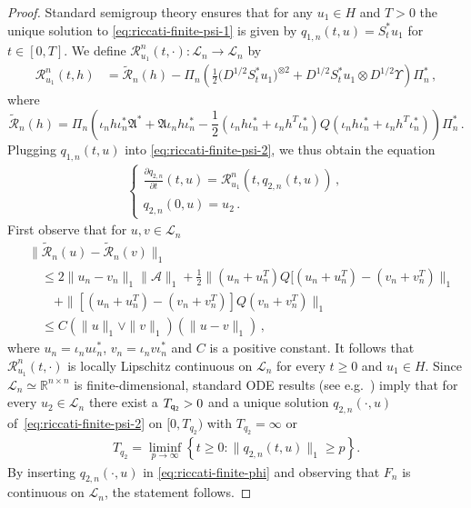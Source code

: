 \documentclass[10pt,a4paper,reqno]{amsart}
\numberwithin{equation}{section}
\theoremstyle{plain}
\theoremstyle{definition}
\theoremstyle{example}
\renewcommand{\MR}{\mathbb{R}}
\newcommand{\R}{\MR}
\newcommand{\cA}{\mathcal{A}}
\newcommand{\cL}{\mathcal{L}}
\newcommand{\cO}{\mathcal{O}}
\newcommand{\cR}{\mathcal{R}}
\newcommand{\fA}{\mathfrak{A}}
\newcommand{\set}[1]{\left\{ #1\right\}}
\newcommand{\norm}[1]{\|#1\|}
\begin{document}
\begin{proof}
Standard semigroup theory ensures that for any $u_{1}\in H$ and $T>0$ the unique solution to
\eqref{eq:riccati-finite-psi-1} is given by $q_{1,n}(t,u)=S_t^*u_{1}$ for $t\in
[0,T]$. We define $\cR_{u_1}^n (t, \cdot)\colon \cL_n \to \cL_n$ by 
\begin{align}\label{eq:Ru1}
\cR_{u_1}^n(t,h) &=  \tilde{\cR}_n(h)-\Pi_n\left(\tfrac{1}{2}\big(D^{1/2}S_t^*u_{1}\big)^{\otimes 2}+ D^{1/2}S_t^*u_{1}\otimes D^{1/2}\Upsilon\right)\Pi_n^*\,,
\end{align}
where 
$$\tilde{\cR}_n(h)=\Pi_n\left( \iota_n h\iota_n^*\fA^*+\fA \iota_n h \iota_n^* - \frac{1}{2}(\iota_n h \iota_n^*+ \iota_n h^T \iota_n^*) Q(\iota_n h \iota_n^*+ \iota_n h^T \iota_n^*)\right)\Pi_n^*\,.$$
Plugging $q_{1,n}(t,u)$ into \eqref{eq:riccati-finite-psi-2}, we thus obtain the equation
\begin{align*}
  \begin{cases}
    \frac{\partial q_{2,n}}{\partial t}(t,u)= \cR_{u_1}^n(t, q_{2,n}(t,u))\,,\\
     q_{2,n}(0,u)=u_{2}\,. 
  \end{cases}
\end{align*}
First observe that for $u, v \in \cL_n$
\begin{align*}
    &\norm{\tilde{\cR}_n(u) - \tilde{\cR}_n( v)}_1\\
    &\quad\leq  
    2\|u_n-v_n\|_{1} \|\cA\|_{1} + \frac{1}{2} \norm{(u_n+u_n^T)Q[(u_n+u_n^T)-(v_n+v_n^T)}_{1}\\
    &\qquad +\norm{[(u_n+u_n^T)-(v_n+v_n^T)]Q(v_n+v_n^T)}_{1} \\
    &\quad \leq C (\norm{u}_1 \vee \norm{v}_1)(\|u-v\|_1)\,,
\end{align*}
where $u_n = \iota_n u\iota^*_n$, $v_n = \iota_n v\iota^*_n$ and $C$ is a positive constant. It follows that 
$\cR_{u_{1}}^n(t,\cdot)$ is locally Lipschitz continuous on $\cL_n$ for every $t\geq 0$ and $u_{1}\in H$. Since $\cL_n \simeq \R^{n\times n}$ is finite-dimensional, standard ODE results (see
e.g.~\cite[Chapter 6, Proposition 1.1]{Mar76}) imply that for every $u_{2}\in \cL_n$ there exist a $T_{\sf q_{2}}>0$ and a unique solution
$q_{2,n}(\cdot,u)$ of~\eqref{eq:riccati-finite-psi-2} on $[0,T_{q_{2}})$ with $T_{q_{2}}=\infty$ or 
\begin{align*}
T_{q_{2}}=\liminf_{p\to\infty}\set{t\geq 0\colon \norm{ q_{2,n}(t,u)}_{1}\geq
  p}.
\end{align*}
By inserting $q_{2,n}(\cdot,u)$ in  \eqref{eq:riccati-finite-phi} and observing that
$F_n$ is continuous on $\cL_n$, the statement follows.
\end{proof}
\end{document}
